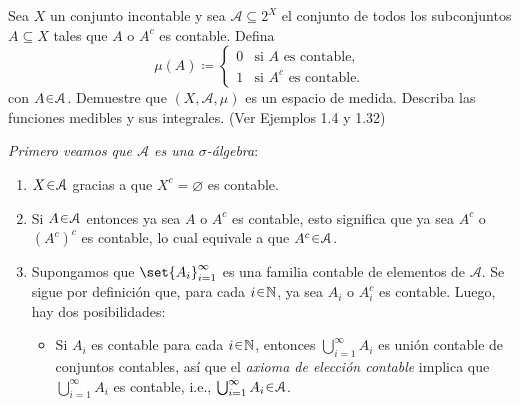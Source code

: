 \setcounter{neje}{56}
\begin{nejer}
Sea $X$ un conjunto incontable y sea $\mathcal{A} \subseteq 2^X$ el conjunto de todos los subconjuntos $A \subseteq X$ tales que $A$ o $A^c$ es contable. Defina
\[
\mu(A)%
\coloneq \begin{cases} 
0 & \text{si } A \text{ es contable,} \\
1 & \text{si } A^c \text{ es contable.}
\end{cases}
\]
con $A \en \mathcal{A}$. Demuestre que $(X, \mathcal{A}, \mu)$ es un espacio de medida. Describa las funciones medibles y sus integrales. (Ver Ejemplos 1.4 y 1.32)
\end{nejer}
\begin{sol}
\emph{Primero veamos que $\mathcal{A}$ es una $\sigma$-álgebra}:
\begin{enumerate}[label=(\roman*)]
\item $X \en \mathcal{A}$ gracias a que $X^c = \varnothing$ es contable.

\item Si $A \en \mathcal{A}$ entonces ya sea $A$ o $A^c$ es contable, esto significa que ya sea $A^c$ o $(A^c)^c$ es contable, lo cual equivale a que $A^c \en \mathcal{A}$.

\item Supongamos que $\set{A_i}^\infty_{i=1}$ es una familia contable de elementos de $\mathcal{A}$. Se sigue por definición que, para cada $i\en\mathbb{N}$, ya sea $A_i$ o $A_i^c$ es contable. Luego, hay dos posibilidades:
\begin{itemize}
    \item Si $A_i$ es contable para cada $i\en\mathbb{N}$, entonces $\bigcup^\infty_{i=1}A_i$ es unión contable de conjuntos contables, así que el \emph{axioma de elección contable} implica que $\bigcup^\infty_{i=1}A_i$ es contable, i.e., $\bigcup^\infty_{i=1}A_i \en \mathcal{A}$. 


\end{itemize}
\end{enumerate}
\end{sol}

